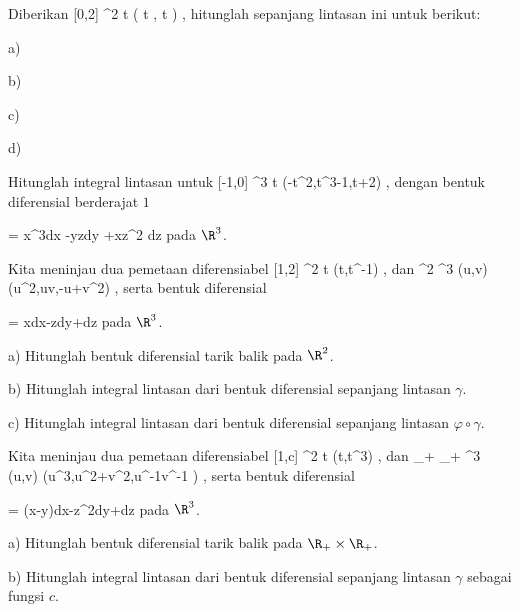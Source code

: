 {}
{

Diberikan
\maabbeledisp {\gamma} { [0,2\pi] } {\R^2
} { t } {( \cos  t , \sin  t )
} {,}
hitunglah
sepanjang lintasan ini untuk
berikut:

a)

b)

c)

d)

}
{} {}

{}
{

Hitunglah integral lintasan
\mathl{\int_\gamma \omega}{} untuk
\maabbeledisp {\gamma} { [-1,0] } {\R^3
} { t } {(-t^2,t^3-1,t+2)
} {,}
dengan bentuk diferensial berderajat $1$

\mavergleichskettedisp
{\vergleichskette
{ \omega
}
{ =} { x^3dx -yzdy +xz^2 dz
}
{ } {
}
{ } {
}
{ } {
}
}
{}{}{}
pada $\R^3$.

}
{} {}

{}
{

Kita meninjau dua pemetaan diferensiabel
\maabbeledisp {\gamma} { [1,2] } {\R^2
} { t } {(t,t^{-1})
} {,}
dan
\maabbeledisp {\varphi} {\R^2} {\R^3
} {(u,v)} {(u^2,uv,-u+v^2)
} {,}
serta bentuk diferensial

\mavergleichskettedisp
{\vergleichskette
{ \omega
}
{ =} { xdx-zdy+dz
}
{ } {
}
{ } {
}
{ } {
}
}
{}{}{}
pada $\R^3$.

a) Hitunglah bentuk diferensial tarik balik
\mathl{\varphi^* \omega}{} pada $\R^2$.

b) Hitunglah integral lintasan dari bentuk diferensial
\mathl{\varphi^* \omega}{} sepanjang lintasan $\gamma$.

c) Hitunglah
 {} {}
integral lintasan dari bentuk diferensial
\mathl{\omega}{} sepanjang lintasan $\varphi \circ \gamma$.

}
{} {}

{}
{

Kita meninjau dua pemetaan diferensiabel
\maabbeledisp {\gamma} { [1,c] } {\R^2
} { t } {(t,t^{3})
} {,}
 {} {}
dan
\maabbeledisp {\varphi} {\R_+ \times \R_+ } {\R^3
} {(u,v)} {(u^3,u^2+v^2,u^{-1}v^{-1} )
} {,}
serta bentuk diferensial

\mavergleichskettedisp
{\vergleichskette
{ \omega
}
{ =} { (x-y)dx-z^2dy+dz
}
{ } {
}
{ } {
}
{ } {
}
}
{}{}{}
pada $\R^3$.

a) Hitunglah bentuk diferensial tarik balik
\mathl{\varphi^* \omega}{} pada $\R_+ \times \R_+$.

b) Hitunglah integral lintasan dari bentuk diferensial
\mathl{\varphi^* \omega}{} sepanjang lintasan $\gamma$ sebagai fungsi $c$.

}
{} {}

